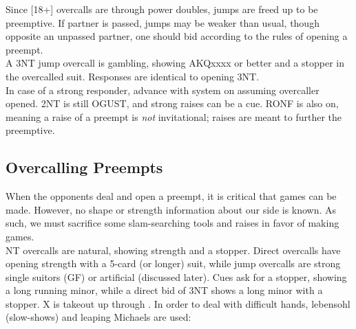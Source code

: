 \documentclass[12pt]{report}
\newcommand{\n}{\\}
\begin{document}
    Since [18+] overcalls are through power doubles, jumps are freed up to be preemptive.  If partner is passed, jumps may be weaker than usual, though opposite an unpassed partner, one should bid according to the rules of opening a preempt. \n

    A 3NT jump overcall is gambling, showing AKQxxxx or better and a stopper in the overcalled suit.  Responses are identical to opening 3NT. \n

    In case of a strong responder, advance with system on assuming overcaller opened.  2NT is still OGUST, and strong raises can be a cue. RONF is also on, meaning a raise of a preempt is \textit{not} invitational; raises are meant to further the preemptive.

\subsection{Overcalling Preempts}

    When the opponents deal and open a preempt, it is critical that games can be made.  However, no shape or strength information about our side is known.  As such, we must sacrifice some slam-searching tools and raises in favor of making games. \n

    NT overcalls are natural, showing strength and a stopper.  Direct overcalls have opening strength with a 5-card (or longer) suit, while jump overcalls are strong single suitors (GF) or artificial (discussed later).  Cues ask for a stopper, showing a long running minor, while a direct bid of 3NT shows a long minor with a stopper. X is takeout up through .  In order to deal with difficult hands, lebensohl (slow-shows) and leaping Michaels are used:
\end{document}
